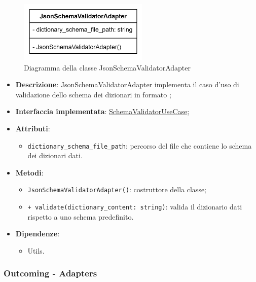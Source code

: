 \label{JsonSchemaValidatorAdapter}
\begin{figure}[H]
    \centering
    \includegraphics[width=0.55\textwidth]{assets/Backend/json_schema_validator_adapter.png}
    \caption{Diagramma della classe JsonSchemaValidatorAdapter}
  \end{figure}
\begin{itemize}
    \item \textbf{Descrizione}: JsonSchemaValidatorAdapter implementa il caso d'uso di validazione dello schema dei dizionari in formato ;
    \item \textbf{Interfaccia implementata}: \hyperref[SchemaValidatorUseCase]{SchemaValidatorUseCase};
    \item \textbf{Attributi}:
    \begin{itemize}
        \item \texttt{dictionary\_schema\_file\_path}: percorso del file  che contiene lo schema dei dizionari dati.
    \end{itemize}
    \item \textbf{Metodi}:
    \begin{itemize}
        \item \texttt{JsonSchemaValidatorAdapter()}: costruttore della classe;
        \item \texttt{+ validate(dictionary\_content: string)}: valida il dizionario dati rispetto a uno schema predefinito.
    \end{itemize}
    \item \textbf{Dipendenze}:
    \begin{itemize}
        \item Utils.
    \end{itemize}
\end{itemize} 

\subsubsection{Outcoming - Adapters}

